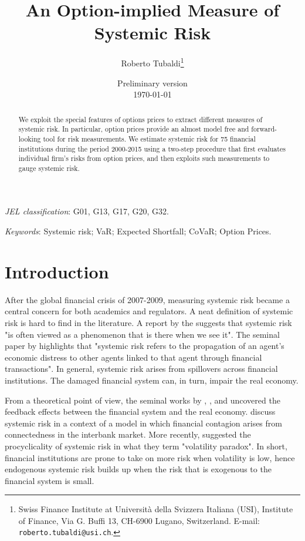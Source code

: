 \documentclass[11pt,a4paper,english]{article}
\title{An Option-implied Measure of Systemic Risk}
\author{Roberto Tubaldi\thanks{Swiss Finance Institute at Universit\`{a} della Svizzera Italiana (USI), Institute of Finance, Via G. Buffi 13, CH-6900 Lugano, Switzerland. E-mail: \texttt{roberto.tubaldi@usi.ch}.}}
\date{Preliminary version\\
	\monthyeardate\today}
\begin{document}
   \maketitle
 \begin{abstract}
 	We exploit the special features of options prices to extract different measures of systemic risk. In particular, option prices provide an almost model free and forward-looking tool for risk measurements. We estimate systemic risk for 75 financial institutions during the period 2000-2015 using a two-step procedure that first evaluates individual firm's risks from option prices, and then exploits such measurements to gauge systemic risk.
 \end{abstract}

\medskip

\noindent \textit{JEL classification}: G01, G13, G17, G20, G32.

\medskip
\noindent \textit{Keywords}: Systemic risk; VaR; Expected Shortfall; CoVaR; Option Prices.

\newpage

\section{Introduction}
After the global financial crisis of 2007-2009, measuring systemic risk became a central concern for both academics and regulators. A neat definition of systemic risk is hard to find in the literature. A report by the \citet{Fund2009} suggests that systemic risk "is often viewed as a phenomenon that is there when we see it". The seminal paper by \citet{Rochet1996} highlights that "systemic risk refers to the propagation of an agent’s economic distress to other agents linked to that agent through financial transactions".  In general, systemic risk arises from spillovers across financial institutions. The damaged financial system can, in turn, impair the real economy.

From a theoretical point of view, the seminal works by \citet{Bernanke1989}, \citet{Bernanke1999}, and \citet{Kiyotaki1997} uncovered the feedback effects between the financial system and the real economy. \citet{Rochet1996} discuss systemic risk in a context of a model in which financial contagion arises from connectedness in the interbank market.  More recently, \citet{Brunnermeier2014} suggested the procyclicality of systemic risk in what they term "volatility paradox". In short, financial institutions are prone to take on more risk when volatility is low, hence endogenous systemic risk builds up when the risk that is exogenous to the financial system is small.
\end{document}
